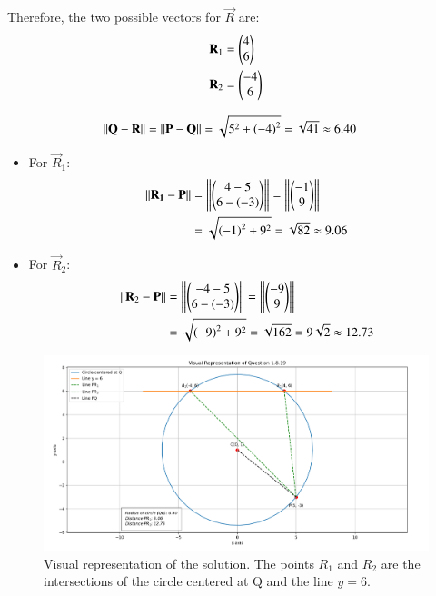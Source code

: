 \documentclass[journal]{IEEEtran}
\begin{document}
Therefore, the two possible vectors for $\vec{R}$ are:
\begin{align}
\mathbf{R}_1 &= \begin{pmatrix}4 \\ 6\end{pmatrix}  \\  \mathbf{R}_2 &= \begin{pmatrix}-4 \\ 6\end{pmatrix}
\end{align}


\begin{align}
     \left\lVert\mathbf{Q} - \mathbf{R}\right\rVert&= \left\lVert\mathbf{P} - \mathbf{Q}\right\rVert = \sqrt{5^2 + \left(-4\right)^2} = \sqrt{41} \approx 6.40
\end{align}

\begin{itemize}
    \item For $\vec{R}_1$:
    \begin{align}
     \left\lVert\mathbf{R_1} - \mathbf{P}\right\rVert &= \left\lVert \begin{pmatrix}4 - 5 \\ 6 - \left(-3\right)\end{pmatrix}\right\rVert  = \left\lVert \begin{pmatrix}-1 \\ 9\end{pmatrix}\right\rVert \\
    &= \sqrt{\left(-1\right)^2 + 9^2} = \sqrt{82} \approx 9.06
    \end{align}
    \item For $\vec{R}_2$:
    \begin{align}
    \left\lVert\mathbf{R}_2 - \mathbf{P}\right\rVert &= \left\lVert\begin{pmatrix}-4 - 5 \\ 6 - \left(-3\right)\end{pmatrix}\right\rVert  = \left\lVert\begin{pmatrix}-9 \\ 9\end{pmatrix}\right\rVert \\
    &= \sqrt{\left(-9\right)^2 + 9^2} = \sqrt{162} = 9\sqrt{2} \approx 12.73
    \end{align}
\end{itemize}

\begin{figure}[h!]
    \centering
    \includegraphics[width=0.9\columnwidth]{figs/pure_python.png}
    \caption{Visual representation of the solution. The points $R_1$ and $R_2$ are the intersections of the circle centered at Q and the line $y=6$.}
    \label{fig:fig}
 \end{figure}
\end{document}
